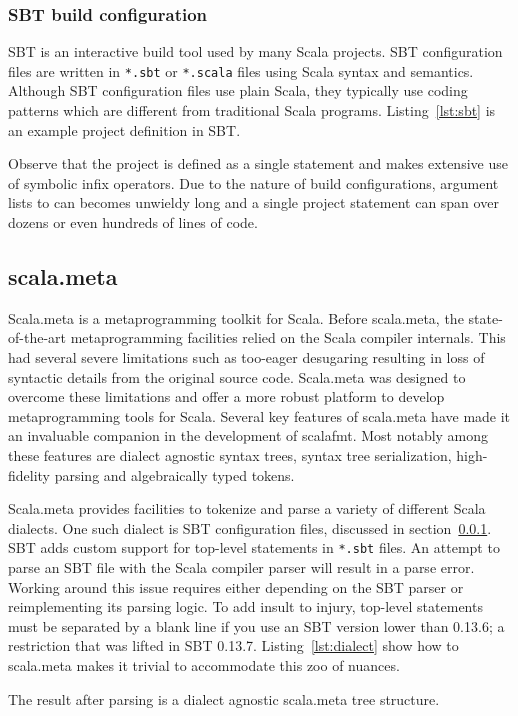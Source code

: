 \subsubsection{SBT build configuration}\label{sec:sbt}
SBT\autocite{_sbt_????} is an interactive build tool used by many Scala projects.
SBT configuration files are written in \texttt{*.sbt} or \texttt{*.scala} files using Scala syntax and semantics.
Although SBT configuration files use plain Scala, they typically use coding patterns which are different from traditional Scala programs.
Listing~\ref{lst:sbt} is an example project definition in SBT.

Observe that the project is defined as a single statement and makes extensive use of symbolic infix operators.
Due to the nature of build configurations, argument lists to can becomes unwieldy long and a single project statement can span over dozens or even hundreds of lines of code.


\subsection{scala.meta}\label{sec:scalameta}
Scala.meta\autocite{scala57:online} is a metaprogramming toolkit for Scala.
Before scala.meta, the state-of-the-art metaprogramming facilities relied on the Scala compiler internals.
This had several severe limitations such as too-eager desugaring resulting in loss of syntactic details from the original source code.
Scala.meta was designed to overcome these limitations and offer a more robust platform to develop metaprogramming tools for Scala.
Several key features of scala.meta have made it an invaluable companion in the development of scalafmt.
Most notably among these features are dialect agnostic syntax trees, syntax tree serialization, high-fidelity  parsing and algebraically typed tokens.

Scala.meta provides facilities to tokenize and parse a variety of different Scala dialects.
One such dialect is SBT configuration files, discussed in section~\ref{sec:sbt}.
SBT adds custom support for top-level statements in \texttt{*.sbt} files.
An attempt to parse an SBT file with the Scala compiler parser will result in a parse error.
Working around this issue requires either depending on the SBT parser or reimplementing its parsing logic.
To add insult to injury, top-level statements must be separated by a blank line if you use an SBT version lower than 0.13.6; a restriction that was lifted in SBT 0.13.7.
Listing~\ref{lst:dialect} show how to scala.meta makes it trivial to accommodate this zoo of nuances.

The result after parsing is a dialect agnostic scala.meta tree structure.

